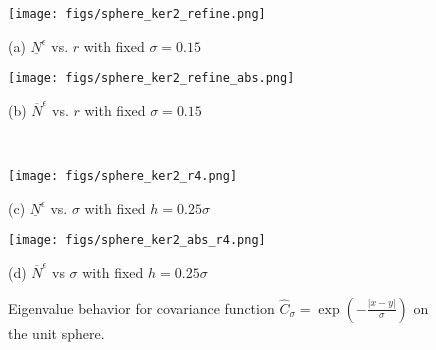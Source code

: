 \documentclass[11pt]{amsart}
\begin{document}
\begin{figure}[!htb]
	\begin{center}
		\hspace{-0.6cm}
		\begin{minipage}{0.46\textwidth}
			\texttt{[image: figs/sphere\_ker2\_refine.png]}
			\caption*{(a) $\underline{N}^{\epsilon}$ vs. $r$ with fixed $\sigma=0.15$}
		\end{minipage}
		\hfil
		\begin{minipage}{0.46\textwidth}
			\texttt{[image: figs/sphere\_ker2\_refine\_abs.png]}
			\caption*{(b) $\overline{N}^{\epsilon}$ vs. $r$ with fixed $\sigma=0.15$}
		\end{minipage}
		\\
		\vspace{0.3cm}
		\hspace{-0.6cm}
		\begin{minipage}{0.46\textwidth}
			\texttt{[image: figs/sphere\_ker2\_r4.png]}
			\caption*{(c) $\underline{N}^{\epsilon}$ vs. $\sigma$ with fixed $h=0.25\sigma$}
		\end{minipage}
		\hfil
		\begin{minipage}{0.46\textwidth}
			\texttt{[image: figs/sphere\_ker2\_abs\_r4.png]}
			\caption*{(d) $\overline{N}^{\epsilon}$ vs $\sigma$ with fixed $h=0.25\sigma$}
		\end{minipage}
		\caption{Eigenvalue behavior for covariance function $\hat{C}_{\sigma}=\exp(-\frac{|x-y|}{\sigma})$ on the unit sphere.}
		\label{fig:sphere-ker2}
	\end{center}
\end{figure}
\end{document}
